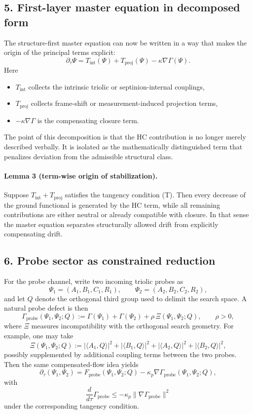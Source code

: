 \subsection*{5. First-layer master equation in decomposed form}
The structure-first master equation can now be written in a way that makes the
origin of the principal terms explicit:
\[
\partial_\tau \Psi
= T_{\mathrm{int}}(\Psi)
+ T_{\mathrm{proj}}(\Psi)
- \kappa\nabla\Gamma(\Psi).
\]
Here
\begin{itemize}
    \item $T_{\mathrm{int}}$ collects the intrinsic triolic or septinion-internal
    couplings,
    \item $T_{\mathrm{proj}}$ collects frame-shift or measurement-induced projection
    terms,
    \item $-\kappa\nabla\Gamma$ is the compensating closure term.
\end{itemize}
The point of this decomposition is that the HC contribution is no longer merely
described verbally. It is isolated as the mathematically distinguished term that
penalizes deviation from the admissible structural class.

\paragraph{Lemma 3 (term-wise origin of stabilization).}
Suppose $T_{\mathrm{int}}+T_{\mathrm{proj}}$ satisfies the tangency condition
\textup{(T)}. Then every decrease of the ground functional is generated by the HC
term, while all remaining contributions are either neutral or already
compatible with closure. In that sense the master equation separates
structurally allowed drift from explicitly compensating drift.

\subsection*{6. Probe sector as constrained reduction}
For the probe channel, write two incoming triolic probes as
\[
\Psi_1=(A_1,B_1,C_1,R_1), \qquad \Psi_2=(A_2,B_2,C_2,R_2),
\]
and let $Q$ denote the orthogonal third group used to delimit the search space.
A natural probe defect is then
\[
\Gamma_{\mathrm{probe}}(\Psi_1,\Psi_2;Q)
:= \Gamma(\Psi_1)+\Gamma(\Psi_2)
   + \rho\,\Xi(\Psi_1,\Psi_2;Q), \qquad \rho>0,
\]
where $\Xi$ measures incompatibility with the orthogonal search geometry. For
example, one may take
\[
\Xi(\Psi_1,\Psi_2;Q)
:= |\langle A_1,Q\rangle|^2 + |\langle B_1,Q\rangle|^2
 + |\langle A_2,Q\rangle|^2 + |\langle B_2,Q\rangle|^2,
\]
possibly supplemented by additional coupling terms between the two probes.
Then the same compensated-flow idea yields
\[
\partial_\tau(\Psi_1,\Psi_2)
= F_{\mathrm{probe}}(\Psi_1,\Psi_2;Q)
- \kappa_p\nabla\Gamma_{\mathrm{probe}}(\Psi_1,\Psi_2;Q),
\]
with
\[
\frac{d}{d\tau}\Gamma_{\mathrm{probe}} \le -\kappa_p
\|\nabla\Gamma_{\mathrm{probe}}\|^2
\]
under the corresponding tangency condition.

